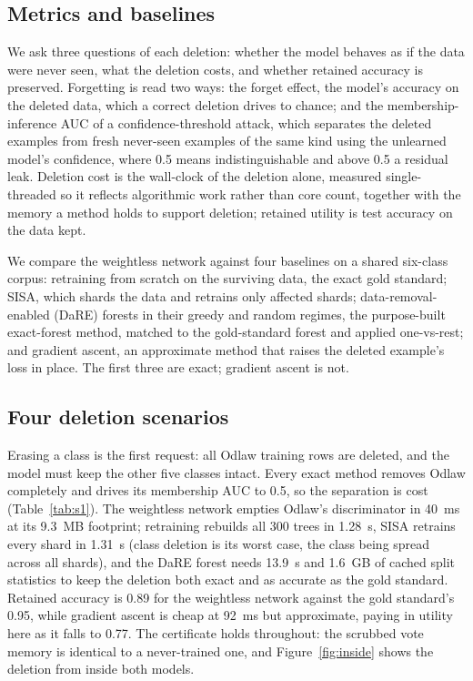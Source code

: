 \subsection{Metrics and baselines}
\label{sec:unl-setup}

We ask three questions of each deletion: whether the model behaves as if the data were never seen, what the deletion costs, and whether retained accuracy is preserved. Forgetting is read two ways: the forget effect, the model's accuracy on the deleted data, which a correct deletion drives to chance; and the membership-inference AUC of a confidence-threshold attack, which separates the deleted examples from fresh never-seen examples of the same kind using the unlearned model's confidence, where 0.5 means indistinguishable and above 0.5 a residual leak. Deletion cost is the wall-clock of the deletion alone, measured single-threaded so it reflects algorithmic work rather than core count, together with the memory a method holds to support deletion; retained utility is test accuracy on the data kept.

We compare the weightless network against four baselines on a shared six-class corpus: retraining from scratch on the surviving data, the exact gold standard; SISA, which shards the data and retrains only affected shards; data-removal-enabled (DaRE) forests in their greedy and random regimes, the purpose-built exact-forest method, matched to the gold-standard forest and applied one-vs-rest; and gradient ascent, an approximate method that raises the deleted example's loss in place. The first three are exact; gradient ascent is not.

\subsection{Four deletion scenarios}
\label{sec:unl-results}

Erasing a class is the first request: all Odlaw training rows are deleted, and the model must keep the other five classes intact. Every exact method removes Odlaw completely and drives its membership AUC to 0.5, so the separation is cost (Table~\ref{tab:s1}). The weightless network empties Odlaw's discriminator in 40~ms at its 9.3~MB footprint; retraining rebuilds all 300 trees in 1.28~s, SISA retrains every shard in 1.31~s (class deletion is its worst case, the class being spread across all shards), and the DaRE forest needs 13.9~s and 1.6~GB of cached split statistics to keep the deletion both exact and as accurate as the gold standard. Retained accuracy is 0.89 for the weightless network against the gold standard's 0.95, while gradient ascent is cheap at 92~ms but approximate, paying in utility here as it falls to 0.77. The certificate holds throughout: the scrubbed vote memory is identical to a never-trained one, and Figure~\ref{fig:inside} shows the deletion from inside both models.

